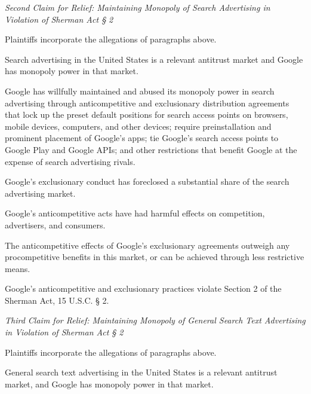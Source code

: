 \documentclass[11pt,b5paper,headings=small]{scrartcl}
\begin{document}
\textit{Second Claim for Relief: Maintaining Monopoly of Search Advertising in Violation of
Sherman Act § 2}


Plaintiffs incorporate the allegations of paragraphs above.


Search advertising in the United States is a relevant antitrust market and Google
has monopoly power in that market.


Google has willfully maintained and abused its monopoly power in search
advertising through anticompetitive and exclusionary distribution agreements that lock up the
preset default positions for search access points on browsers, mobile devices, computers, and
other devices; require preinstallation and prominent placement of Google’s apps; tie Google’s
search access points to Google Play and Google APIs; and other restrictions that benefit Google
at the expense of search advertising rivals.


Google’s exclusionary conduct has foreclosed a substantial share of the search
advertising market.


Google’s anticompetitive acts have had harmful effects on competition,
advertisers, and consumers.


The anticompetitive effects of Google’s exclusionary agreements outweigh any
procompetitive benefits in this market, or can be achieved through less restrictive means.


Google’s anticompetitive and exclusionary practices violate Section 2 of the
Sherman Act, 15 U.S.C. § 2.

\textit{Third Claim for Relief: Maintaining Monopoly of General Search Text Advertising in
Violation of Sherman Act § 2}


Plaintiffs incorporate the allegations of paragraphs above.


General search text advertising in the United States is a relevant antitrust market,
and Google has monopoly power in that market.
\end{document}
